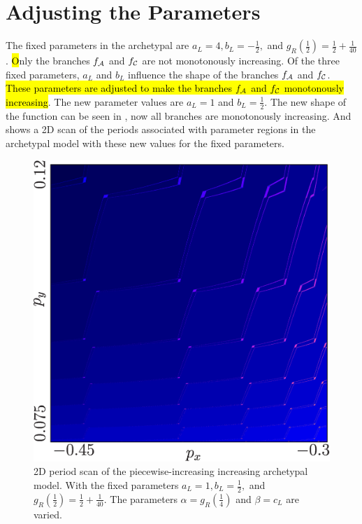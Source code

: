 \section{Adjusting the Parameters}
\label{sec:add.parameters}

The fixed parameters in the archetypal are $a_L = 4, b_L = -\frac{1}{2},$ and $g_R\left(\frac{1}{2}\right) = \frac{1}{2} + \frac{1}{40}$.
\hl{O}nly the branches $f_{\mathcal{A}}$ and $f_{\mathcal{C}}$ are not monotonously increasing.
Of the three fixed parameters, $a_L$ and $b_L$ influence the shape of the branches $f_{\mathcal{A}}$ and $f_{\mathcal{C}}$.
\hl{These parameters are adjusted to make the branches $f_{\mathcal{A}}$ and $f_{\mathcal{C}}$ monotonously increasing}.
The new parameter values are $a_L = 1$ and $b_L = \frac{1}{2}$.
The new shape of the function can be seen in , now all branches are monotonously increasing.
And  shows a 2D scan of the periods associated with parameter regions in the archetypal model with these new values for the fixed parameters.

\begin{figure}
	\centering
	\includegraphics[width=.7 \textwidth]{../Figures/7/7.1/result.png}
	\caption[2D period scan of the piecewise-increasing increasing archetypal model]{
		2D period scan of the piecewise-increasing increasing archetypal model.
		With the fixed parameters $a_L = 1, b_L = \frac{1}{2},$ and $g_R\left(\frac{1}{2}\right) = \frac{1}{2} + \frac{1}{40}$.
		The parameters $\alpha = g_R\left(\frac{1}{4}\right)$ and $\beta = c_L$ are varied.
	}
	\label{fig:add.arch.new.period}
\end{figure}


